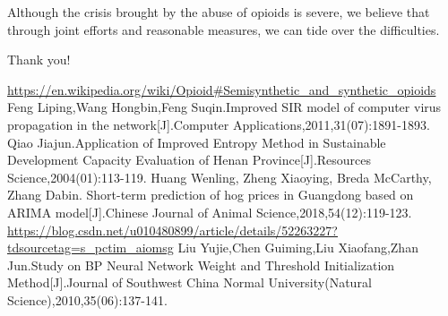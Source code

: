 \documentclass[12pt]{mcmthesis}
\begin{document}
Although the crisis brought by the abuse of opioids is severe, we believe that through joint efforts and reasonable measures, we can tide over the difficulties.\par Thank you!
\newpage
\begin{thebibliography}{99}
\url{https://en.wikipedia.org/wiki/Opioid#Semisynthetic_and_synthetic_opioids}
 Feng Liping,Wang Hongbin,Feng Suqin.Improved SIR model of computer virus propagation in the network[J].Computer Applications,2011,31(07):1891-1893.
 Qiao Jiajun.Application of Improved Entropy Method in Sustainable Development Capacity Evaluation of Henan Province[J].Resources Science,2004(01):113-119.
 Huang Wenling, Zheng Xiaoying, Breda McCarthy, Zhang Dabin. Short-term prediction of hog prices in Guangdong based on ARIMA model[J].Chinese Journal of Animal Science,2018,54(12):119-123.
\url{https://blog.csdn.net/u010480899/article/details/52263227?tdsourcetag=s_pctim_aiomsg}
 Liu Yujie,Chen Guiming,Liu Xiaofang,Zhan Jun.Study on BP Neural Network Weight and Threshold Initialization Method[J].Journal of Southwest China Normal University(Natural Science),2010,35(06):137-141.
\end{thebibliography}
\newpage
\end{document}
